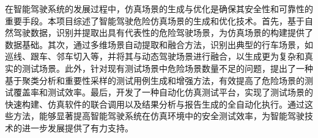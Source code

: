 \begin{abstractzh}


在智能驾驶系统的发展过程中，仿真场景的生成与优化是确保其安全性和可靠性的重要手段。本项目综述了智能驾驶危险仿真场景的生成和优化技术。首先，基于自然驾驶数据，识别并提取出具有代表性的危险驾驶场景，为仿真场景的构建提供了数据基础。其次，通过多维场景自动提取和融合方法，识别出典型的行车场景，如巡线、跟车、邻车切入等，并将其与动态驾驶场景进行融合，以生成更为复杂和真实的测试场景。此外，针对现有测试场景中危险场景数量不足的问题，提出了一种基于聚类分析和重要性采样的测试用例生成和增强方法，有效提高了危险场景的测试覆盖率和测试效率。最后，开发了一种自动化仿真测试平台，实现了测试场景的快速构建、仿真软件的联合调用以及结果分析与报告生成的全自动化执行。通过这些方法，能够显著提高智能驾驶系统在仿真环境中的安全测试效率，为智能驾驶技术的进一步发展提供了有力支持。


\end{abstractzh}